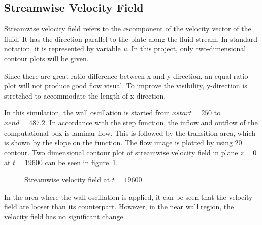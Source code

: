 \subsection{Streamwise Velocity Field}
Streamwise velocity field refers to the \emph{x}-component of the velocity vector of the fluid. It has the direction parallel to the plate along the fluid stream. In standard notation, it is represented by variable \emph{u}. In this project, only two-dimensional contour plots will be given.

Since there are great ratio difference between x and y-direction, an equal ratio plot will not produce good flow visual. To improve the visibility, y-direction is stretched to accommodate the length of x-direction.

In this simulation, the wall oscillation is started from $xstart = 250$ to $xend = 487.2$. In accordance with the step function, the inflow and outflow of the computational box is laminar flow. This is followed by the transition area, which is shown by the slope on the function. The flow image is plotted by using 20 contour. Two dimensional contour plot of streamwise velocity field in plane $z=0$ at $t = 19600$ can be seen in figure~\ref{fig:u(x,y)}.

\begin{figure}[!h]
  \centering
  \caption{Streamwise velocity field at $t = 19600$ }
  \label{fig:u(x,y)}
\end{figure}

In the area where the wall oscillation is applied, it can be seen that the velocity field are looser than its counterpart. However, in the near wall region, the velocity field has no significant change.

